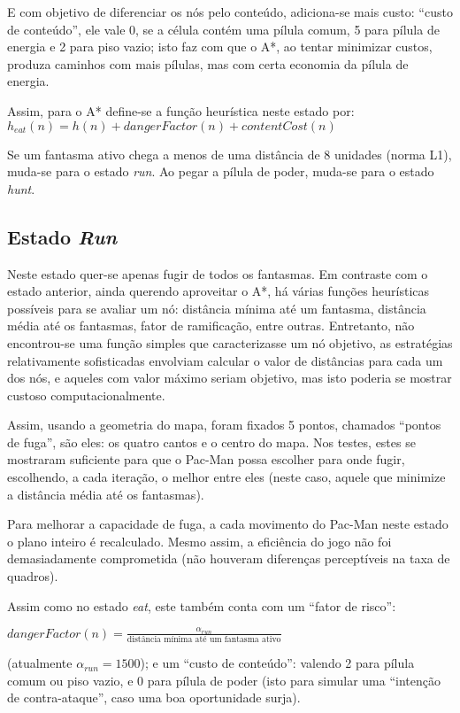 \documentclass[a4paper]{scrartcl}
\begin{document}
E com objetivo de diferenciar os nós pelo conteúdo, adiciona-se mais custo: ``custo de conteúdo'',
ele vale 0, se a célula contém uma pílula comum, 5 para pílula de energia e 2 para piso vazio; isto
faz com que o A*, ao tentar minimizar custos, produza caminhos com mais pílulas, mas com certa economia da pílula de energia.

Assim, para o A* define-se a função heurística neste estado por:
$h_{eat}(n) = h(n) + dangerFactor(n) + contentCost(n)$

Se um fantasma ativo chega a menos de uma distância de 8 unidades (norma L1), muda-se
para o estado \textit{run}. Ao pegar a pílula de poder, muda-se para o estado \textit{hunt}.

\subsection{Estado \textit{Run}}

Neste estado quer-se apenas fugir de todos os fantasmas. Em contraste com o estado anterior,
ainda querendo aproveitar o A*, há várias funções heurísticas possíveis para se avaliar um nó:
distância mínima até um fantasma, distância média até os fantasmas, fator de ramificação, entre outras. Entretanto, não encontrou-se uma função simples que caracterizasse um nó objetivo, as estratégias relativamente sofisticadas envolviam calcular o valor de distâncias para 
cada um dos nós, e aqueles com valor máximo seriam objetivo, mas isto poderia se mostrar custoso
computacionalmente. 

Assim, usando a geometria do mapa, foram fixados 5 pontos, chamados ``pontos de fuga'', são eles:
os quatro cantos e o centro do mapa. Nos testes, estes se mostraram suficiente para que o Pac-Man
possa escolher para onde fugir, escolhendo, a cada iteração, o melhor entre eles (neste caso, aquele
que minimize a distância média até os fantasmas).

Para melhorar a capacidade de fuga, a cada movimento do Pac-Man neste estado o plano inteiro é recalculado. Mesmo assim, a eficiência do jogo não foi demasiadamente comprometida (não houveram
diferenças perceptíveis na taxa de quadros).

Assim como no estado \textit{eat}, este também conta com um ``fator de risco'':

$dangerFactor(n) =  \frac{\alpha_{run}}{\text{distância mínima até um fantasma ativo}}$

(atualmente $\alpha_{run} = 1500$); e um ``custo de conteúdo'': valendo 2 para pílula comum ou piso vazio, e 0 para pílula de poder (isto para simular uma ``intenção de contra-ataque'', caso uma boa oportunidade surja).
\end{document}
